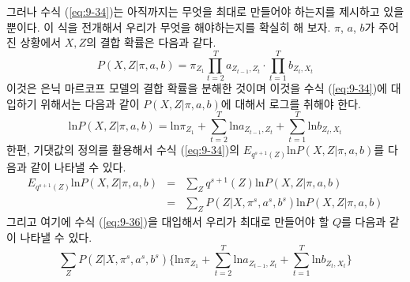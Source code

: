 \documentclass[a4paper]{oblivoir}
\begin{document}
그러나 수식 (\ref{eq:9-34})는 아직까지는 무엇을 최대로 만들어야 하는지를 제시하고 있을 뿐이다. 이 식을 전개해서 우리가 무엇을 해야하는지를 확실히 해 보자. $\pi$, $a$, $b$가 주어진 상황에서 $X,Z$의 결합 확률은 다음과 같다. 
\begin{equation}
P(X,Z|\pi,a,b) = \pi_{Z_1} \prod_{t=2}^{T} a_{Z_{t-1}, Z_{t}} \cdot \prod_{t=1}^{T} b_{Z_{t}, X_{t}} 
\label{eq:9-35}
\end{equation} 
이것은 은닉 마르코프 모델의 결합 확률을 분해한 것이며 이것을 수식 (\ref{eq:9-34})에 대입하기 위해서는 다음과 같이 $P(X,Z|\pi,a,b)$에 대해서 로그를 취해야 한다.
\begin{equation}
\mathrm{ln} P(X,Z|\pi,a,b) = \mathrm{ln} \pi_{Z_1} + \sum_{t=2}^{T} \mathrm{ln} a_{Z_{t-1}, Z_{t}} + \sum_{t=1}^{T} \mathrm{ln} b_{Z_{t}, X_{t}} 
\label{eq:9-36}
\end{equation} 
한편, 기댓값의 정의를 활용해서 수식 (\ref{eq:9-34})의 $E_{q^{s+1}(Z)} \textrm{ln} P(X, Z|\pi, a, b)$를 다음과 같이 나타낼 수 있다. 
\begin{eqnarray}
E_{q^{s+1}(Z)} \textrm{ln} P(X, Z|\pi, a, b) & = & \sum_{Z} q^{s+1}(Z) \mathrm{ln} P(X,Z|\pi,a,b) \nonumber \\
& = & \sum_{Z} P(Z|X,\pi^{s}, a^{s}, b^{s}) \mathrm{ln} P(X,Z|\pi,a,b) \label{eq:9-37}
\end{eqnarray} 
그리고 여기에 수식 (\ref{eq:9-36})을 대입해서 우리가 최대로 만들어야 할 $Q$를 다음과 같이 나타낼 수 있다.
\begin{equation}
\sum_{Z} P(Z|X,\pi^{s}, a^{s}, b^{s}) \{\mathrm{ln} \pi_{Z_1} + \sum_{t=2}^{T} \mathrm{ln} a_{Z_{t-1}, Z_{t}} + \sum_{t=1}^{T} \mathrm{ln} b_{Z_{t}, X_{t}}\}
\label{eq:9-38}
\end{equation} 
  
\end{document}
